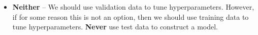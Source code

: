 \begin{itemize}
     \item[] {\bf Neither} -- We should use validation data to tune hyperparameters. However, if for some reason this is not an option, then we should use training data to tune hyperparameters. {\bf Never} use test data to construct a model.
\end{itemize}
